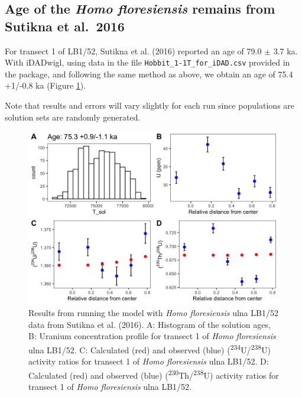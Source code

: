 \documentclass[]{elsarticle} %
\begin{document}
\hypertarget{age-of-the-homo-floresiensis-remains-from-sutikna-et-al.2016}{%
\subsection{\texorpdfstring{Age of the \emph{Homo floresiensis} remains from Sutikna et al.~2016}{Age of the Homo floresiensis remains from Sutikna et al.~2016}}\label{age-of-the-homo-floresiensis-remains-from-sutikna-et-al.2016}}

For transect 1 of LB1/52, Sutikna et al. (2016) reported an age of 79.0 \(\pm\) 3.7 ka. With iDADwigl, using data in the file \texttt{Hobbit\_1-1T\_for\_iDAD.csv} provided in the package, and following the same method as above, we obtain an age of 75.4 +1/-0.8 ka (Figure \ref{fig:plot-panel-hobbit-fig}).

Note that results and errors will vary slightly for each run since populations are solution sets are randomly generated.

\newpage



\begin{figure}
\includegraphics[width=0.95\linewidth]{figures/plot-panel-hobbit} \caption{Results from running the model with \emph{Homo floresiensis} ulna LB1/52 data from Sutikna et al. (2016). A: Histogram of the solution ages, B: Uranium concentration profile for transect 1 of \emph{Homo floresiensis} ulna LB1/52. C: Calculated (red) and observed (blue) (\textsuperscript{234}U/\textsuperscript{238}U) activity ratios for transect 1 of \emph{Homo floresiensis} ulna LB1/52. D: Calculated (red) and observed (blue) (\textsuperscript{230}Th/\textsuperscript{238}U) activity ratios for transect 1 of \emph{Homo floresiensis} ulna LB1/52.}\label{fig:plot-panel-hobbit-fig}
\end{figure}
\end{document}
